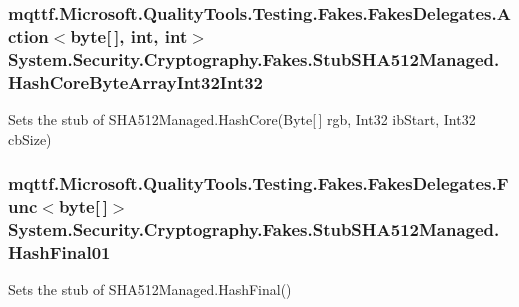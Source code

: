 \hypertarget{class_system_1_1_security_1_1_cryptography_1_1_fakes_1_1_stub_s_h_a512_managed_a09c1f4acfb66885cc5d59b093a713ce8}{
\subsubsection[{Hash\-Core\-Byte\-Array\-Int32\-Int32}]{\setlength{\rightskip}{0pt plus 5cm}mqttf.\-Microsoft.\-Quality\-Tools.\-Testing.\-Fakes.\-Fakes\-Delegates.\-Action$<$byte\mbox{[}$\,$\mbox{]}, int, int$>$ System.\-Security.\-Cryptography.\-Fakes.\-Stub\-S\-H\-A512\-Managed.\-Hash\-Core\-Byte\-Array\-Int32\-Int32}}\label{class_system_1_1_security_1_1_cryptography_1_1_fakes_1_1_stub_s_h_a512_managed_a09c1f4acfb66885cc5d59b093a713ce8}


Sets the stub of S\-H\-A512\-Managed.\-Hash\-Core(\-Byte\mbox{[}$\,$\mbox{]} rgb, Int32 ib\-Start, Int32 cb\-Size)

\hypertarget{class_system_1_1_security_1_1_cryptography_1_1_fakes_1_1_stub_s_h_a512_managed_a7582484914dab4c2f70426f1475b9faa}{
\subsubsection[{Hash\-Final01}]{\setlength{\rightskip}{0pt plus 5cm}mqttf.\-Microsoft.\-Quality\-Tools.\-Testing.\-Fakes.\-Fakes\-Delegates.\-Func$<$byte\mbox{[}$\,$\mbox{]}$>$ System.\-Security.\-Cryptography.\-Fakes.\-Stub\-S\-H\-A512\-Managed.\-Hash\-Final01}}\label{class_system_1_1_security_1_1_cryptography_1_1_fakes_1_1_stub_s_h_a512_managed_a7582484914dab4c2f70426f1475b9faa}


Sets the stub of S\-H\-A512\-Managed.\-Hash\-Final()


